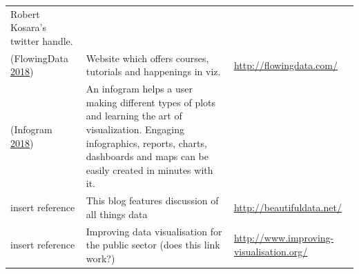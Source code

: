 \documentclass[]{book}
\theoremstyle{definition}
\theoremstyle{definition}
\theoremstyle{definition}
\theoremstyle{remark}
\begin{document}
\begin{longtable}[]{@{}lll@{}}
\begin{minipage}[t]{0.28\columnwidth}
Robert Kosara's twitter handle.\strut
\end{minipage}\tabularnewline
\begin{minipage}[t]{0.15\columnwidth}\raggedright\strut
(FlowingData \protect\hyperlink{ref-flowingdata}{2018})\strut
\end{minipage} & \begin{minipage}[t]{0.28\columnwidth}\raggedright\strut
Website which offers courses, tutorials and happenings in viz.\strut
\end{minipage} & \begin{minipage}[t]{0.48\columnwidth}\raggedright\strut
\url{http://flowingdata.com/}\strut
\end{minipage}\tabularnewline
\begin{minipage}[t]{0.15\columnwidth}\raggedright\strut
(Infogram \protect\hyperlink{ref-infogram}{2018})\strut
\end{minipage} & \begin{minipage}[t]{0.28\columnwidth}\raggedright\strut
An infogram helps a user making different types of plots and learning
the art of visualization. Engaging infographics, reports, charts,
dashboards and maps can be easily created in minutes with it.\strut
\end{minipage} & \begin{minipage}[t]{0.48\columnwidth}\raggedright\strut
\strut
\end{minipage}\tabularnewline
\begin{minipage}[t]{0.15\columnwidth}\raggedright\strut
insert reference\strut
\end{minipage} & \begin{minipage}[t]{0.28\columnwidth}\raggedright\strut
This blog features discussion of all things data\strut
\end{minipage} & \begin{minipage}[t]{0.48\columnwidth}\raggedright\strut
\url{http://beautifuldata.net/}\strut
\end{minipage}\tabularnewline
\begin{minipage}[t]{0.15\columnwidth}\raggedright\strut
insert reference\strut
\end{minipage} & \begin{minipage}[t]{0.28\columnwidth}\raggedright\strut
Improving data visualisation for the public sector (does this link
work?)\strut
\end{minipage} & \begin{minipage}[t]{0.48\columnwidth}\raggedright\strut
\url{http://www.improving-visualisation.org/}\strut

\end{minipage}
\end{longtable}
\end{document}
